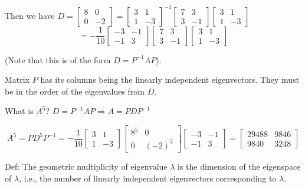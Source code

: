 \documentclass{article}
\begin{document}
Then we have \( D = \begin{bmatrix} 8 & 0 \\ 0 & -2 \end{bmatrix} = \begin{bmatrix} 3 & 1 \\ 1 & -3 \end{bmatrix}^{-1} \begin{bmatrix} 7 & 3 \\ 3 & -1 \end{bmatrix} \begin{bmatrix} 3 & 1 \\ 1 & -3 \end{bmatrix} \)
\[ = -\frac{1}{10} \begin{bmatrix} -3 & -1 \\ -1 & 3 \end{bmatrix} \begin{bmatrix} 7 & 3 \\ 3 & -1 \end{bmatrix} \begin{bmatrix} 3 & 1 \\ 1 & -3 \end{bmatrix} \]


(Note that this is of the form \( D = P^{-1}AP \)).

Matrix \( P \) has its columns being the linearly independent eigenvectors. They must be in the order of the eigenvalues from \( D \).


What is \( A^5 \)? \( D = P^{-1}AP \Rightarrow A = PDP^{-1} \)

\[
A^5 = PD^5P^{-1} = -\frac{1}{10} \begin{bmatrix} 3 & 1 \\ 1 & -3 \end{bmatrix} \begin{bmatrix} 8^5 & 0 \\ 0 & (-2)^5 \end{bmatrix} \begin{bmatrix} -3 & -1 \\ -1 & 3 \end{bmatrix} = \begin{bmatrix} 29488 & 9846 \\ 9840 & 3248 \end{bmatrix}
\]

Def: The geometric multiplicity of eigenvalue \( \lambda \) is the dimension of the eigenspace of \( \lambda \), i.e., the number of linearly independent eigenvectors corresponding to \( \lambda \).
\end{document}
